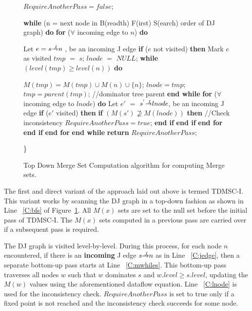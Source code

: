 {\begin{figure}[!ht]
\begin{minipage}[t]{5in}
\begin{code}
 $RequireAnotherPass=false$;

 {\bf while} (n = next node in B(readth) F(irst) S(earch) order of DJ graph) {\bf do} \label{C:bfs}
      {\bf for} ($\forall$ incoming edge to $n$) {\bf do} \label{C:jedge}

          Let $e = s \st{J} n$ , be an incoming J edge
          {\bf if} ($e$ not visited) {\bf then}
              Mark $e$ as visited 
              $tmp$ $=$ $s$;
              $lnode$ $=$ $NULL$;
              {\bf while} $(level(tmp)\ge level(n))$ {\bf do} \label{C:mwhiles}

                   $M(tmp)=M(tmp)\cup M(n)\cup \{n\}$;
                   $lnode=tmp$;
                   $tmp=parent(tmp)$; //dominator tree parent
              {\bf end while} \label{C:mwhilee}
              {\bf for} ($\forall$ incoming edge to $lnode$) {\bf do} \label{C:lnode}
                  Let $e'$ $=$ $s^{'} \st{J} lnode$, be an incoming J edge
                  {\bf if} ($e'$ visited) {\bf then}
                     {\bf if} $(M(s') \not\supseteq M(lnode))$ {\bf then} //Check inconsistency
                         $RequireAnotherPass = true$;
                     {\bf end if}
                  {\bf end if}
              {\bf end for}
          {\bf end if}
     {\bf end for}
 {\bf end while}
 {\bf return} $RequireAnotherPass$;
\end{code}
\}
\end{minipage}
\caption{Top Down Merge Set Computation algorithm for computing Merge sets.}
\label{F:tdmsc}
\end{figure} 

The first and direct variant of the approach laid out above is termed TDMSC-I. This variant works by scanning the DJ graph in a top-down fashion as shown in Line ~\ref{C:bfs}
of Figure~\ref{F:tdmsc}. All $M(x)$ sets are set to the null set before the initial pass of TDMSC-I. The $M(x)$ sets computed in a previous pass are carried over if a subsequent pass is required. 

The DJ graph is visited
level-by-level. During this process, for each node $n$ encountered, if there is an {\bf incoming}
J edge $s \st{J} n$ as in Line ~\ref{C:jedge}, then a separate bottom-up pass starts at 
Line ~\ref{C:mwhiles}. This bottom-up pass traverses all nodes $w$ such that $w$ dominates $s$ and $w.level \geq s.level$,
updating the $M(w)$ values using the aforementioned dataflow equation. Line ~\ref{C:lnode} is used for
the inconsistency check. $RequireAnotherPass$ is set to true only if a fixed point is not reached
and the inconsistency check succeeds for some node.

}

